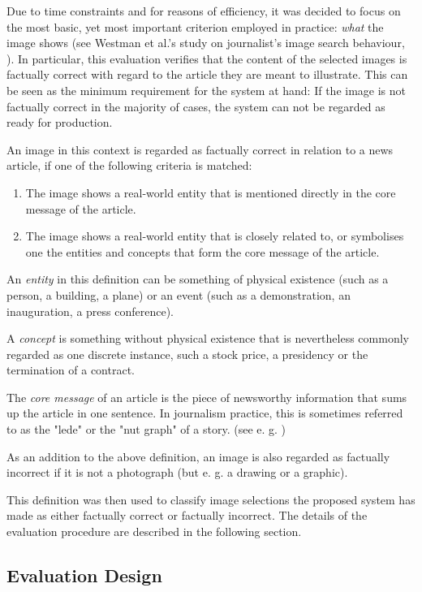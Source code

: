 \documentclass[11pt,a4paper,twoside]{article}
\begin{document}
Due to time constraints and for reasons of efficiency, it was decided to focus on the most basic, yet most important criterion employed in practice: \emph{what} the image shows (see Westman et al.'s study on journalist's image search behaviour, \cite{Westman2006ImageContext}). In particular, this evaluation verifies that the content of the selected images is factually correct with regard to the article they are meant to illustrate. This can be seen as the minimum requirement for the system at hand: If the image is not factually correct in the majority of cases, the system can not be regarded as ready for production.

An image in this context is regarded as factually correct in relation to a news article, if one of the following criteria is matched:

\begin{enumerate}
    \setlength\itemsep{0em}
    \item The image shows a real-world entity that is mentioned directly in the core message of the article.
    \item The image shows a real-world entity that is closely related to, or symbolises one the entities and concepts that form the core message of the article.
\end{enumerate}

An \emph{entity} in this definition can be something of physical existence (such as a person, a building, a plane) or an event (such as a demonstration, an inauguration, a press conference).

A \emph{concept} is something without physical existence that is nevertheless commonly regarded as one discrete instance, such a stock price, a presidency or the termination of a contract.

The \emph{core message} of an article is the piece of newsworthy information that sums up the article in one sentence. In journalism practice, this is sometimes referred to as the "lede" or the "nut graph" of a story. (see e. g. \cite[p. 110]{Rich2015WritingMethod})

As an addition to the above definition, an image is also regarded as factually incorrect if it is not a photograph (but e. g. a drawing or a graphic).

This definition was then used to classify image selections the proposed system has made as either factually correct or factually incorrect. The details of the evaluation procedure are described in the following section.

\subsection{Evaluation Design} \label{EvalDesign}
\end{document}

